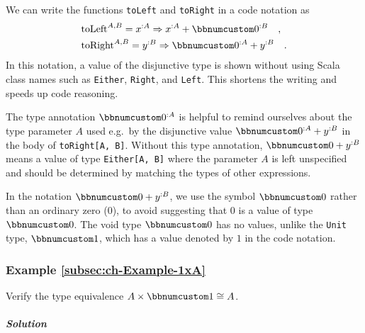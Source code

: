 \noindent We can write the functions \lstinline!toLeft! and \lstinline!toRight!
in a code notation as 
\begin{align*}
 & \text{toLeft}^{A,B}=x^{:A}\Rightarrow x^{:A}+\bbnum 0^{:B}\quad,\\
 & \text{toRight}^{A,B}=y^{:B}\Rightarrow\bbnum 0^{:A}+y^{:B}\quad.
\end{align*}
In this notation, a value of the disjunctive type is shown without
using Scala class names such as \lstinline!Either!, \lstinline!Right!,
and \lstinline!Left!. This shortens the writing and speeds up code
reasoning.

The type annotation $\bbnum 0^{:A}$ is helpful to remind ourselves
about the type parameter $A$ used e.g.~by the disjunctive value
$\bbnum 0^{:A}+y^{:B}$ in the body of \lstinline!toRight[A, B]!.
Without this type annotation, $\bbnum 0+y^{:B}$ means a value of
type \lstinline!Either[A, B]! where the parameter $A$ is left unspecified
and should be determined by matching the types of other expressions.

In the notation $\bbnum 0+y^{:B}$, we use the symbol $\bbnum 0$
rather than an ordinary zero ($0$), to avoid suggesting that $0$
is a value of type $\bbnum 0$. The void type $\bbnum 0$ has no values,
unlike the \lstinline!Unit! type, $\bbnum 1$, which has a value
denoted by $1$ in the code notation.

\subsubsection{Example \label{subsec:ch-Example-1xA}\ref{subsec:ch-Example-1xA}}

Verify the type equivalence $A\times\bbnum 1\cong A$.

\subparagraph{Solution}

